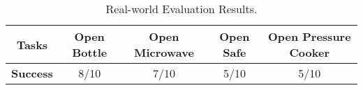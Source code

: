 \begin{table}[htbp]
\caption{Real-world Evaluation Results.}
  \label{tab:real_success}
  \centering
  \vspace{0.1cm}

  \begin{tabular}{ccccc}
    \toprule
    \textbf{Tasks} & Open Bottle & Open Microwave &
    Open Safe & Open Pressure Cooker\\
    \toprule
    \textbf{Success} & 8/10  & 7/10  & 5/10 & 5/10 \\
    \bottomrule
  \end{tabular}
\end{table}